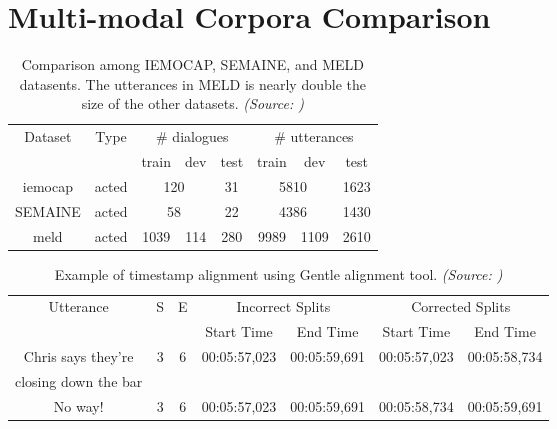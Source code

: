 \section{Multi-modal Corpora Comparison}

\begin{table}[h!] 
    \centering
	\begin{tabular}{cccccccc}
		\toprule
		\multirow{2}{*}{Dataset} & \multirow{2}{*}{Type} & \multicolumn{3}{c}{\# dialogues} & \multicolumn{3}{c}{\# utterances} \\ \cline{3-8}
        & & train & dev & test & train & dev & test \\ \midrule
        \ac{iemocap} \cite{iemocap} & acted & \multicolumn{2}{c}{120} & 31 & \multicolumn{2}{c}{5810} & 1623 \\
        SEMAINE \cite{semaine} & acted & \multicolumn{2}{c}{58} & 22 & \multicolumn{2}{c}{4386} & 1430 \\
        \ac{meld} \cite{meld} & acted & 1039 & 114 & 280 & 9989 & 1109 & 2610 \\ \bottomrule
	\end{tabular}
    \captionsetup{width=0.7\linewidth}
    \caption[Comparison among IEMOCAP, SEMAINE, and MELD datasents]{Comparison among IEMOCAP, SEMAINE, and MELD datasents. The utterances in MELD is nearly double the size of the other datasets. \textit{(Source: \cite{meld})}}
    \label{tab:copuscompare}
\end{table}

\begin{table}[h!]
    \centering
    \begin{tabular}{ccccccc}
        \toprule
        \multirow{2}{*}{Utterance} & \multirow{2}{*}{S} & \multirow{2}{*}{E} & \multicolumn{2}{c}{Incorrect Splits} & \multicolumn{2}{c}{Corrected Splits} \\ \cline{4-7}
        & & & Start Time & End Time & Start Time & End Time \\ \midrule
        Chris says they're & \multirow{2}{*}{3} & \multirow{2}{*}{6} & \multirow{2}{*}{00:05:57,023} & \multirow{2}{*}{00:05:59,691} & \multirow{2}{*}{00:05:57,023} & \multirow{2}{*}{00:05:58,734} \\
        closing down the bar & & & & & & \\
        No way! & 3 & 6 & 00:05:57,023 & 00:05:59,691 & 00:05:58,734 & 00:05:59,691 \\ \bottomrule
    \end{tabular}
    \captionsetup{width=\linewidth}
    \caption[Timestamp alignment using Gentle alignment tool]{Example of timestamp alignment using Gentle alignment tool. \textit{(Source: \cite{meld})}}
    \label{tab:meldtime}
\end{table}

